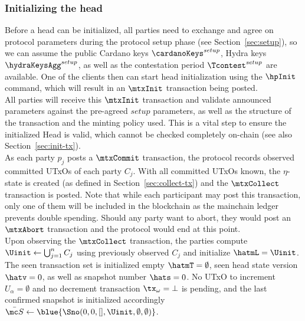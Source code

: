 \subsubsection{Initializing the head}

\quad Before a head can be initialized, all parties need
to exchange and agree on protocol parameters during the protocol setup phase
(see Section~\ref{sec:setup}), so we can assume the public Cardano keys
$\cardanoKeys^{setup}$, Hydra keys $\hydraKeysAgg^{setup}$, as well as the
contestation period $\Tcontest^{setup}$ are available. One of the clients then can
start head initialization using the $\hpInit$ command, which will result in an
$\mtxInit$ transaction being posted. \\

\quad All parties will receive this $\mtxInit$
transaction and validate announced parameters against the pre-agreed $setup$
parameters, as well as the structure of the transaction and the minting policy
used. This is a vital step to ensure the initialized Head is valid, which
cannot be checked completely on-chain (see also Section~\ref{sec:init-tx}). \\

\quad As each party $p_{j}$ posts a
$\mtxCommit$ transaction, the protocol records observed committed UTxOs of each
party $C_j$. With all committed UTxOs known, the $\eta$-state is created (as
defined in Section~\ref{sec:collect-tx}) and the $\mtxCollect$ transaction is
posted. Note that while each participant may post this transaction, only one of
them will be included in the blockchain as the mainchain ledger prevents double
spending. Should any party want to abort, they would post an $\mtxAbort$
transaction and the protocol would end at this point.\\

\quad Upon observing the $\mtxCollect$
transaction, the parties compute $\Uinit \gets \bigcup_{j=1}^{n} C_j$ using previously
observed $C_j$ and initialize $\hatmL = \Uinit$. The seen transaction set is
initialized empty $\hatmT = \emptyset$, seen head state version $\hatv = 0$, as well as
snapshot number $\hats = 0$. No UTxO to increment $U_{\alpha} = \emptyset$ and no
decrement transaction $\tx_{\omega} = \bot$ is pending, and the last confirmed snapshot
is initialized accordingly $\bar{\mc S} \gets \blue{\Sno(0, 0, [], \Uinit, \emptyset, \emptyset)}$.

